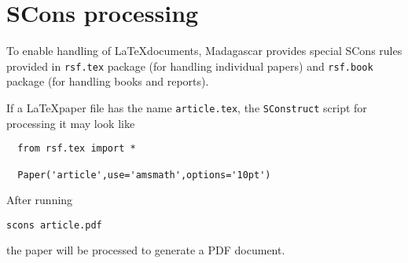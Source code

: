\section{SCons processing}

To enable handling of \LaTeX documents, Madagascar provides special
SCons rules provided in \texttt{rsf.tex} package (for handling
individual papers) and \texttt{rsf.book} package (for handling books
and reports).

If a \LaTeX paper file has the name
\texttt{article.tex}, the \texttt{SConstruct} script for processing it
may look like
\lstset{language=python,showstringspaces=false,frame=single}
\begin{lstlisting}
  from rsf.tex import *

  Paper('article',use='amsmath',options='10pt')
\end{lstlisting}
After running
\begin{verbatim}
scons article.pdf
\end{verbatim}
the paper will be processed to generate a PDF document.

